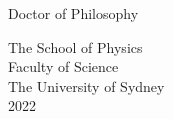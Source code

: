 \begin{titlepage}
\begin{center}
\begin{large}
Doctor of Philosophy

\vspace{0.1in}

The School of Physics\\
Faculty of Science\\
The University of Sydney\\
2022

\end{large}

\end{center}
\end{titlepage}
